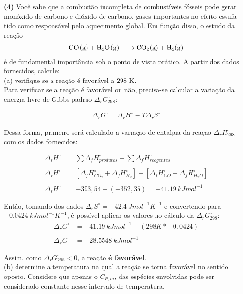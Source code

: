 \textbf{(4)} Você sabe que a combustão incompleta de combustíveis fósseis
pode gerar monóxido de carbono e dióxido de carbono, gases importantes no efeito
estufa tido como responsável pelo aquecimento global. Em função disso, o estudo
da reação
\begin{align*}
    \ce{CO(g) + H2O(g) -> CO2(g) + H2(g)}
\end{align*}
é de fundamental importância sob o ponto de vista prático. A partir dos dados fornecidos,
calcule:\\

(a) verifique se a reação é favorável a 298 K.\\

Para verificar se a reação é favorável ou não, precisa-se calcular a variação da energia livre de Gibbs padrão \( \Delta_rG^\circ_{298}\):

\begin{align*}
	\Delta_rG^\circ = \Delta_rH^\circ - T \Delta_rS^\circ
\end{align*}

Dessa forma, primeiro será calculado a variação de entalpia da reação \( \Delta_rH^\circ_{298}\) com os dados fornecidos:

\begin{align*}
	\Delta_rH^\circ &= \sum\Delta_fH^\circ_{produtos} - \sum\Delta_fH^\circ_{reagentes}\\ \\
	\Delta_rH^\circ &= [\Delta_fH^\circ_{CO_2} + \Delta_fH^\circ_{H_2}] - [ \Delta_fH^\circ_{CO} + \Delta_fH^\circ_{H_2O}]\\ \\
	\Delta_rH^\circ &= -393,54 - (-352,35) = \qty{-41,19}{kJmol^{-1}}
\end{align*}

Então, tomando dos dados \(\Delta_r S^\circ = \qty{-42,4}{Jmol^{-1}K^{-1}}\) e
convertendo para \(\qty{-0,0424}{kJmol^{-1}K^{-1}}\), é possível aplicar os valores no cálculo da \(\Delta_r G^\circ_{298}\):
\begin{align*}
	\Delta_r G^\circ &= \qty{-41,19}{kJmol^{-1}} - (298K * -0,0424) \\ \\
	\Delta_r G^\circ &= \qty{-28,5548}{kJmol^{-1}}
\end{align*}

Assim, como \(\Delta_r G^\circ_{298} < 0\), a reação \textbf{é favorável}. \\ 
 
(b) determine a temperatura na qual a reação se torna favorável no sentido 
oposto. Considere que apenas o \(C_{P,m}\), das espécies envolvidas pode ser
considerado constante nesse intervalo de temperatura.\\

